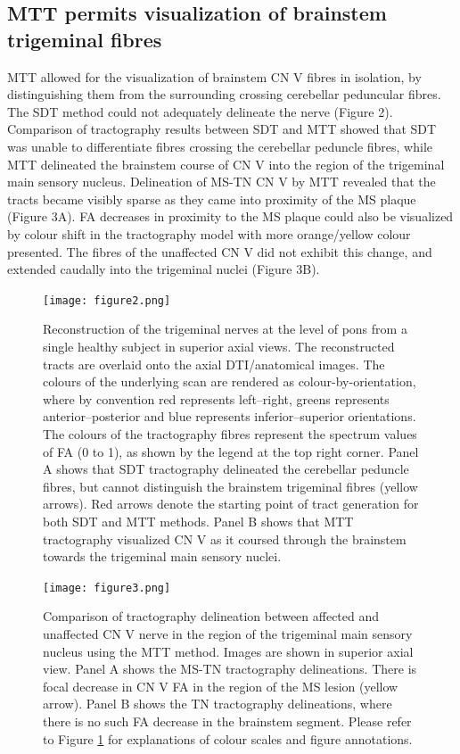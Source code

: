 \subsection{MTT permits visualization of brainstem trigeminal fibres}
MTT allowed for the visualization of brainstem CN V fibres in isolation, by distinguishing them from the surrounding crossing cerebellar peduncular fibres. The SDT method could not adequately delineate the nerve (Figure 2). Comparison of tractography results between SDT and MTT showed that SDT was unable to differentiate fibres crossing the cerebellar peduncle fibres, while MTT delineated the brainstem course of CN V into the region of the trigeminal main sensory nucleus. Delineation of MS-TN CN V by MTT revealed that the tracts became visibly sparse as they came into proximity of the MS plaque (Figure 3A). FA decreases in proximity to the MS plaque could also be visualized by colour shift in the tractography model with more orange/yellow colour presented. The fibres of the unaffected CN V did not exhibit this change, and extended caudally into the trigeminal nuclei (Figure 3B). 

\begin{figure}[p]
\texttt{[image: figure2.png]}
\caption[Reconstruction of the trigeminal nerves at the level of pons from a single healthy subject in superior axial views.]{Reconstruction of the trigeminal nerves at the level of pons from a single healthy subject in superior axial views. The reconstructed tracts are overlaid onto the axial DTI/anatomical images. The colours of the underlying scan are rendered as colour-by-orientation, where by convention red represents left–right, greens represents anterior–posterior and blue represents inferior–superior orientations. The colours of the tractography fibres represent the spectrum values of FA (0 to 1), as shown by the legend at the top right corner. Panel A shows that SDT tractography delineated the cerebellar peduncle fibres, but cannot distinguish the brainstem trigeminal fibres (yellow arrows). Red arrows denote the starting point of tract generation for both SDT and MTT methods. Panel B shows that MTT tractography visualized CN V as it coursed through the brainstem towards the trigeminal main sensory nuclei.}
\centering
\label{fig:MSfigure2}
\end{figure}

\begin{figure}[p]
\texttt{[image: figure3.png]}
\caption[Comparison of tractography delineation between affected and unaffected CN V nerve in the region of the trigeminal main sensory nucleus using the MTT method.]{Comparison of tractography delineation between affected and unaffected CN V nerve in the region of the trigeminal main sensory nucleus using the MTT method. Images are shown in superior axial view. Panel A shows the MS-TN tractography delineations. There is focal decrease in CN V FA in the region of the MS lesion (yellow arrow). Panel B shows the TN tractography delineations, where there is no such FA decrease in the brainstem segment. Please refer to Figure \protect\ref{fig:MSfigure2} for explanations of colour scales and figure annotations.}
\centering
\label{fig:MSfigure3}
\end{figure}


